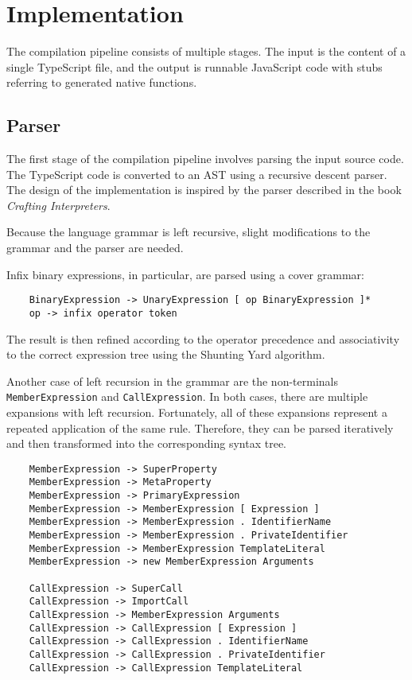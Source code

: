 \chapter{Implementation}

The compilation pipeline consists of multiple stages. The input is the content of a single TypeScript file, and the output is runnable JavaScript code with stubs referring to generated native functions.


\section{Parser}

The first stage of the compilation pipeline involves parsing the input source code. The TypeScript code is converted to an AST using a recursive descent parser. The design of the implementation is inspired by the parser described in the book \textit{Crafting Interpreters}\cite{craftinginterpreters}.

Because the language grammar is left recursive, slight modifications to the grammar and the parser are needed.

Infix binary expressions, in particular, are parsed using a cover grammar:

\begin{verbatim}
    BinaryExpression -> UnaryExpression [ op BinaryExpression ]*
    op -> infix operator token
\end{verbatim}

The result is then refined according to the operator precedence and associativity to the correct expression tree using the Shunting Yard algorithm\cite{algol60}.

Another case of left recursion in the grammar are the non-terminals \texttt{MemberExpression} and \texttt{CallExpression}. In both cases, there are multiple expansions with left recursion. Fortunately, all of these expansions represent a repeated application of the same rule. Therefore, they can be parsed iteratively and then transformed into the corresponding syntax tree.

\begin{verbatim}
    MemberExpression -> SuperProperty
    MemberExpression -> MetaProperty
    MemberExpression -> PrimaryExpression
    MemberExpression -> MemberExpression [ Expression ]
    MemberExpression -> MemberExpression . IdentifierName
    MemberExpression -> MemberExpression . PrivateIdentifier
    MemberExpression -> MemberExpression TemplateLiteral
    MemberExpression -> new MemberExpression Arguments

    CallExpression -> SuperCall
    CallExpression -> ImportCall
    CallExpression -> MemberExpression Arguments
    CallExpression -> CallExpression [ Expression ]
    CallExpression -> CallExpression . IdentifierName
    CallExpression -> CallExpression . PrivateIdentifier
    CallExpression -> CallExpression TemplateLiteral
\end{verbatim}


